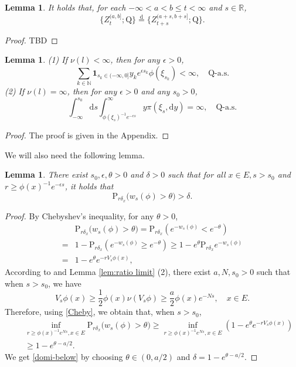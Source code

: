 \documentclass[12pt,a4paper]{amsart}
\numberwithin{equation}{section}
\theoremstyle{plain}
\newtheorem{lem}[thm]{Lemma}
\theoremstyle{definition}
\theoremstyle{remark}
\begin{document}
\begin{lem}\label{thm:E.3}
	It holds that, for each $-\infty < a < b \leq t<\infty$ and $s\in \mathbb R$,
	\[
	\{Z_t^{(a,b]}; \mathrm Q\} \overset{\text{d}}= \{Z_{t+s}^{(a+s,b+s]}; \mathrm Q\}.
	\]
\end{lem}
\begin{proof}
	TBD
\end{proof}
\begin{lem}\label{thm:E.4}	
	(1) If $\nu(l)<\infty$,
	then for any $\epsilon>0$,
	\[
	\sum_{k\in \mathbb N} 
	\mathbf 1_{s_k \in (-\infty,0]} y_k e^{\epsilon s_k} \phi(\xi_{s_k}) < \infty, \quad \mathrm Q\text{-a.s.}
	\]
	(2) If  $ \nu(l)=\infty$,
	then for any $\epsilon>0$ and any $s_0>0$,
   	\begin{equation}
	\int^{s_0}_{-\infty} {\mathrm d}s
	\int_{\phi(\xi_s)^{-1}e^{-\epsilon s}}^\infty y\pi(\xi_s,{\mathrm d}y)
     	=\infty,
	\quad {\mathrm Q}\text{-a.s.}
	\end{equation}
\end{lem}
\begin{proof}
The proof is given in the Appendix.
\end{proof}
	We will also need the following lemma.
\begin{lem} \label{thm:E.5}
 There exist $s_0, \epsilon, \theta>0$ and $\delta > 0$  such that for all
    $x\in E, s>s_0$ and $r\geq \phi(x)^{-1}e^{-\epsilon s}$, it holds that
\begin{equation}\label{domi-below}
	\mathrm P_{r \delta_{x}}\big(w_{s}(\phi)>\theta\big) > \delta.
\end{equation}
\end{lem}
\begin{proof}
	By Chebyshev's inequality, for any $\theta>0$,
	\begin{align}
	&\mathrm P_{r\delta_x}\big(w_s(\phi)>\theta\big)=\mathrm P_{r\delta_x}\left(e^{-w_s(\phi)}<e^{-\theta}\right)\\
	=&1-\mathrm P_{r\delta_x}\left(e^{-w_s(\phi)}\geq e^{-\theta}\right)\geq 1-e^{\theta}\mathrm P_{r\delta_x}e^{- w_s(\phi)}\\
	=&1-e^{\theta}e^{-rV_{s}\phi(x)},\label{Cheby}
	\end{align}
According to \cite[Proposition 1.3]{LiuRenSongSun2020} and Lemma \ref{lem:ratio limit} (2),
there exist $a,N, s_0>0$ such that when $s>s_0$, we have
	\[
	V_{s}\phi(x)\ge\frac{1}{2}\phi(x)\nu(V_{s}\phi)\geq
 \dfrac{a}{2}\phi(x)e^{-Ns},\quad x\in E.
	\]
	Therefore, using \eqref{Cheby}, we obtain that, when $s>s_0$,
	\begin{eqnarray*}
		&&\inf_{r\geq \phi(x)^{-1}e^{Ns}, x\in E}\mathrm P_{r\delta_x}\big(w_s(\phi)>\theta\big)\geq \inf_{r\geq \phi(x)^{-1}e^{Ns}, x\in E} \left(1-e^{\theta}e^{-rV_s\phi(x)}\right)\\
		&&     \geq 1-e^{\theta-a/2}.
	\end{eqnarray*}
We get \eqref{domi-below} by
choosing $\theta\in(0, a/2)$ and $\delta=1-e^{\theta-a/2}$.
\end{proof}
\end{document}
